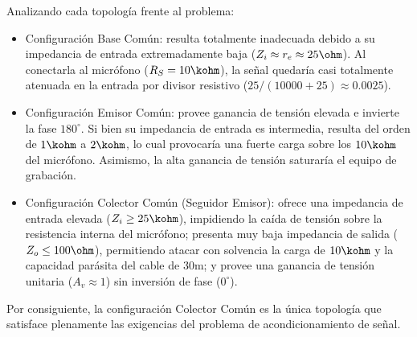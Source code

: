 Analizando cada topología frente al problema:
\begin{itemize}
  \item Configuración Base Común: resulta totalmente inadecuada debido a su impedancia de entrada extremadamente baja
    ($Z_i \approx r_e \approx 25\ohm$). Al conectarla al micrófono ($R_S = 10\kohm$), la señal quedaría casi totalmente
    atenuada en la entrada por divisor resistivo ($25 / (10000 + 25) \approx 0.0025$).
  \item Configuración Emisor Común: provee ganancia de tensión elevada e invierte la fase $180^\circ$. Si bien su
    impedancia de entrada es intermedia, resulta del orden de $1\kohm$ a $2\kohm$, lo cual provocaría una fuerte carga
    sobre los $10\kohm$ del micrófono. Asimismo, la alta ganancia de tensión saturaría el equipo de grabación.
  \item Configuración Colector Común (Seguidor Emisor): ofrece una impedancia de entrada elevada ($Z_i \ge 25\kohm$),
    impidiendo la caída de tensión sobre la resistencia interna del micrófono; presenta muy baja impedancia de salida
    ($Z_o \le 100\ohm$), permitiendo atacar con solvencia la carga de $10\kohm$ y la capacidad parásita del cable de
    $30\unit{\meter}$; y provee una ganancia de tensión unitaria ($A_v \approx 1$) sin inversión de fase ($0^\circ$).
\end{itemize}

Por consiguiente, la configuración Colector Común es la única topología que satisface plenamente las exigencias del
problema de acondicionamiento de señal.

